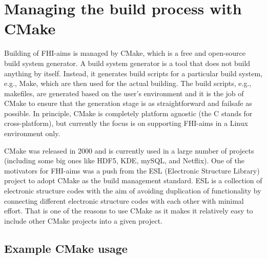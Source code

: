 \section{Managing the build process with CMake}
\label{Sec:build-cmake}

Building of FHI-aims is managed by CMake, which is a free and open-source build system generator. A build system generator is a tool that does not build anything by itself. Instead, it generates build scripts for a particular build system, e.g., Make, which are then used for the actual building. The build scripts, e.g., makefiles, are generated based on the user's environment and it is the job of CMake to ensure that the generation stage is as straightforward and failsafe as possible. In principle, CMake is completely platform agnostic (the C stands for cross-platform), but currently the focus is on supporting FHI-aims in a Linux environment only.

CMake was released in 2000 and is currently used in a large number of projects (including some big ones like HDF5, KDE, mySQL, and Netflix). One of the motivators for FHI-aims was a push from the ESL (Electronic Structure Library) project to adopt CMake as the build management standard. ESL is a collection of electronic structure codes with the aim of avoiding duplication of functionality by connecting different electronic structure codes with each other with minimal effort. That is one of the reasons to use CMake as it makes it relatively easy to include other CMake projects into a given project.

\subsection{\label{sec:minimal_cmake}Example CMake usage}

